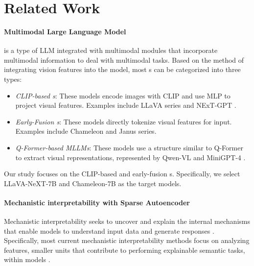 \section{Related Work}
\label{sec:Related Work}

\paragraph{Multimodal Large Language Model}

\model{} is a type of LLM integrated with multimodal modules that incorporate multimodal information to deal with multimodal tasks. Based on the method of integrating vision features into the model, most \model{}s can be categorized into three types:

 
\begin{itemize}
    \item \textit{CLIP-based \model{}s}: These models encode images with CLIP \cite{radford2021learning} and use MLP to project visual features. Examples include LLaVA \cite{liu2024visual} series and NExT-GPT \cite{wu2023next}.
    \item \textit{Early-Fusion \model{}s}: These models directly tokenize visual features for input. Examples include Chameleon \cite{team2024chameleon} and Janus \cite{wu2024janus} series.
    \item \textit{Q-Former-based MLLMs}: These models use a structure similar to Q-Former \cite{li2023blip} to extract visual representations, represented by Qwen-VL \cite{Qwen-VL} and MiniGPT-4 \cite{zhu2024minigpt}.
\end{itemize}

Our study focuses on the CLIP-based and early-fusion \model{}s. Specifically, we select LLaVA-NeXT-7B and Chameleon-7B as the target models.

\paragraph{Mechanistic interpretability with Sparse Autoencoder}

Mechanistic interpretability seeks to uncover and explain the internal mechanisms that enable models to understand input data and generate responses \cite{rai2024practical}. Specifically, most current mechanistic interpretability methods focus on analyzing features, smaller units that contribute to performing explainable semantic tasks, within models \cite{olah2020zoom}.

